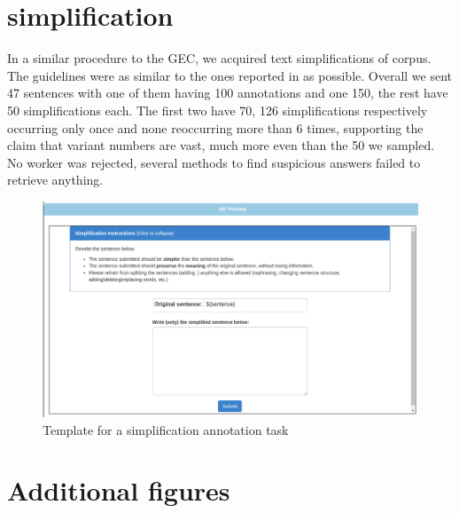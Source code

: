 \documentclass[letterpaper, 11pt]{article}
\begin{document}
\section{simplification}
In a similar procedure to the GEC, we acquired text simplifications of  corpus. The guidelines were as similar to the ones reported in  as possible. 
Overall we sent 47 sentences with one of them having 100 annotations and one 150, the rest have 50 simplifications each. The first two have 70, 126 simplifications respectively occurring only once and none reoccurring more than 6 times, supporting the claim that variant numbers are vast, much more even than the 50 we sampled.
No worker was rejected, several methods to find suspicious answers failed to retrieve anything.
\begin{figure}[htb]
	\includegraphics[width=0.9\columnwidth]{simplification_task}
	\caption{Template for a simplification annotation task} 
\end{figure}
\section{Additional figures}
\end{document}
